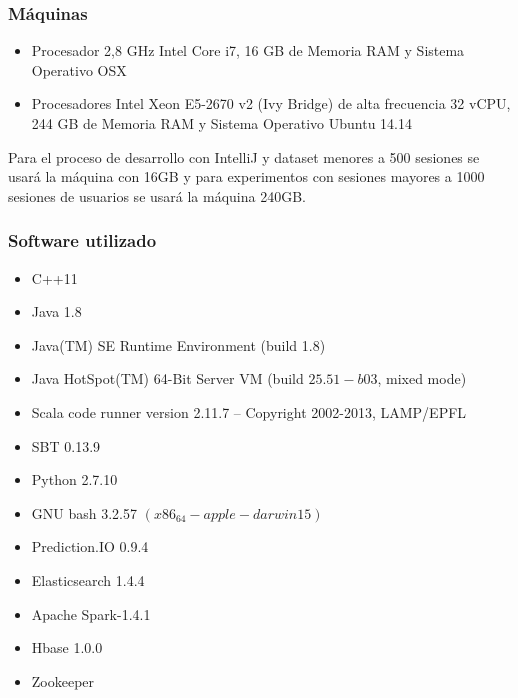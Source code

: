 \subsubsection{Máquinas}
	\begin{itemize}
		\setlength{\itemsep}{1pt}
		\setlength{\parskip}{0pt}
		\setlength{\parsep}{0pt}
		\item Procesador 2,8 GHz Intel Core i7, 16 GB de Memoria RAM y Sistema Operativo OSX
		\item Procesadores Intel Xeon E5-2670 v2 (Ivy Bridge) de alta frecuencia 32 vCPU, 244 GB de Memoria RAM y Sistema Operativo Ubuntu 14.14 
	\end{itemize}
	
Para el proceso de desarrollo con IntelliJ y dataset menores a 500 sesiones se usará la máquina con 16GB y para experimentos con sesiones mayores a 1000 sesiones de usuarios se usará la máquina 240GB.	
	

\subsubsection{Software utilizado}

	\begin{itemize}
		\setlength{\itemsep}{1pt}
		\setlength{\parskip}{0pt}
		\setlength{\parsep}{0pt}
		\item C++11
		\item Java  1.8
		\item Java(TM) SE Runtime Environment (build 1.8)
		\item Java HotSpot(TM) 64-Bit Server VM (build $25.51-b03$, mixed mode)
		\item Scala code runner version 2.11.7 -- Copyright 2002-2013, LAMP/EPFL
		\item SBT 0.13.9 
		\item Python 2.7.10
		\item GNU bash 3.2.57 $(x86_64-apple-darwin15)$
		\item Prediction.IO 0.9.4
		\item Elasticsearch 1.4.4	
		\item Apache Spark-1.4.1
		\item Hbase 1.0.0
		\item Zookeeper 
	\end{itemize}







